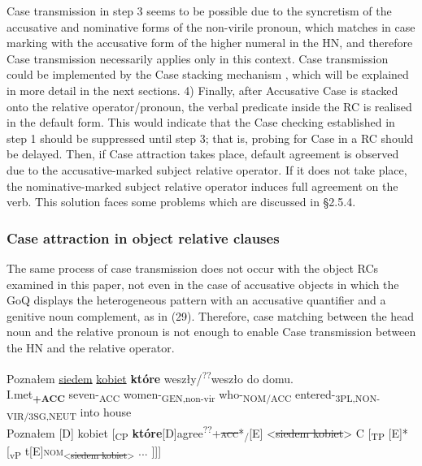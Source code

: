 \documentclass[output=paper]{langsci/langscibook}
\begin{document}
Case transmission in step 3 seems to be possible due to the syncretism of the accusative and nominative forms of the non-virile pronoun, which matches in case marking with the accusative form of the higher numeral in the HN, and therefore Case transmission necessarily applies only in this context. Case transmission could be implemented by the Case stacking mechanism \citep{Vogel2001}, which will be explained in more detail in the next sections. 4) Finally, after Accusative Case is stacked onto the relative operator/pronoun, the verbal predicate inside the RC is realised in the default form. This would indicate that the Case checking established in step 1 should be suppressed until step 3; that is, probing for Case in a RC should be delayed. Then, if Case attraction takes place, default agreement is observed due to the accusative-marked subject relative operator. If it does not take place, the nominative-marked subject relative operator induces full agreement on the verb. This solution faces some problems which are discussed in §2.5.4.

\subsubsection{Case attraction in object relative clauses}%

The same process of case transmission does not occur with the object RCs examined in this paper, not even in the case of accusative objects in which the GoQ displays the heterogeneous pattern with an accusative quantifier and a genitive noun complement, as in (29). Therefore, case matching between the head noun and the relative pronoun is not enough to enable Case transmission between the HN and the relative operator.

\ea\label{ex:leska:29}
\gll Poznałem \ul{siedem}     \ul{kobiet}     \textbf{które} weszły/\textsuperscript{??}weszło   do   domu.\\
     I.met\textbf{\textsubscript{+ACC}} seven-\textsubscript{ACC}   women-\textsubscript{GEN,non-vir}  who-\textsubscript{NOM/ACC}    entered-\textsubscript{3PL,NON-VIR/3SG,NEUT}  into house\\
\glt Poznałem [D] kobiet [\textsubscript{CP} \textbf{które}[D]{agree\textsuperscript{??}+\textsc{\st{acc}}}*\textsubscript{\slash}[E] <\st{siedem kobiet}> C [\textsubscript{TP} [E]* [\textsubscript{vP} t[E]{\footnotesize\textsc{nom}}\textsubscript{<\st{siedem kobiet}>} ... ]]]
\z
\end{document}
